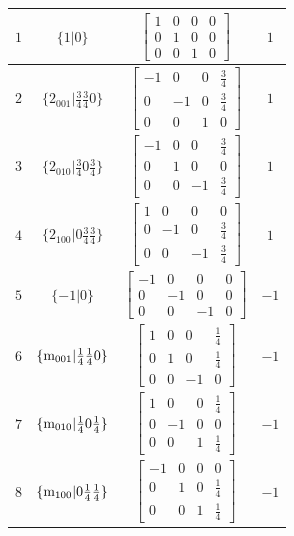 \documentclass[fleqn,8pt]{jsarticle}
\begin{document}
\begin{longtable}{cccc}
$ 1 $ & $ \{1|0\} $ & $ \begin{bmatrix} 1 & 0 & 0 & 0 \\ 0 & 1 & 0 & 0 \\ 0 & 0 & 1 & 0 \end{bmatrix} $ & $ 1 $ \\ \hline
$ 2 $ & $ \{2{}_{001}|\frac{3}{4} \frac{3}{4} 0\} $ & $ \begin{bmatrix} -1 & 0 & 0 & \frac{3}{4} \\ 0 & -1 & 0 & \frac{3}{4} \\ 0 & 0 & 1 & 0 \end{bmatrix} $ & $ 1 $ \\ \hline
$ 3 $ & $ \{2{}_{010}|\frac{3}{4} 0 \frac{3}{4}\} $ & $ \begin{bmatrix} -1 & 0 & 0 & \frac{3}{4} \\ 0 & 1 & 0 & 0 \\ 0 & 0 & -1 & \frac{3}{4} \end{bmatrix} $ & $ 1 $ \\ \hline
$ 4 $ & $ \{2{}_{100}|0 \frac{3}{4} \frac{3}{4}\} $ & $ \begin{bmatrix} 1 & 0 & 0 & 0 \\ 0 & -1 & 0 & \frac{3}{4} \\ 0 & 0 & -1 & \frac{3}{4} \end{bmatrix} $ & $ 1 $ \\ \hline
$ 5 $ & $ \{-1|0\} $ & $ \begin{bmatrix} -1 & 0 & 0 & 0 \\ 0 & -1 & 0 & 0 \\ 0 & 0 & -1 & 0 \end{bmatrix} $ & $ -1 $ \\ \hline
$ 6 $ & $ \{{\rm m}_{001}|\frac{1}{4} \frac{1}{4} 0\} $ & $ \begin{bmatrix} 1 & 0 & 0 & \frac{1}{4} \\ 0 & 1 & 0 & \frac{1}{4} \\ 0 & 0 & -1 & 0 \end{bmatrix} $ & $ -1 $ \\ \hline
$ 7 $ & $ \{{\rm m}_{010}|\frac{1}{4} 0 \frac{1}{4}\} $ & $ \begin{bmatrix} 1 & 0 & 0 & \frac{1}{4} \\ 0 & -1 & 0 & 0 \\ 0 & 0 & 1 & \frac{1}{4} \end{bmatrix} $ & $ -1 $ \\ \hline
$ 8 $ & $ \{{\rm m}_{100}|0 \frac{1}{4} \frac{1}{4}\} $ & $ \begin{bmatrix} -1 & 0 & 0 & 0 \\ 0 & 1 & 0 & \frac{1}{4} \\ 0 & 0 & 1 & \frac{1}{4} \end{bmatrix} $ & $ -1 $ \\
\end{longtable}
\end{document}
